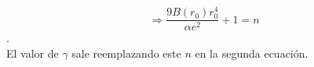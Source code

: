 \documentclass[a4paper]{article}
\begin{document}
$$ \Rightarrow \frac{9B(r_{0})r_{0}^{4}}{\alpha e^{2}} + 1 = n$$.\\

El valor de $\gamma$ sale reemplazando este $n$ en la segunda ecuaci\'on.

\subsection{}

\newpage
\begin{thebibliography}{99} %
 
\end{thebibliography}


\end{document}
